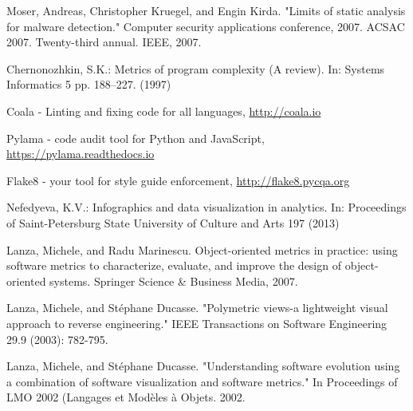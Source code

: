 \documentclass[runningheads,a4paper]{llncs}
\begin{document}
\begin{thebibliography}{4}
 Moser, Andreas, Christopher Kruegel, and Engin Kirda. "Limits of static analysis for malware detection." Computer security applications conference, 2007. ACSAC 2007. Twenty-third annual. IEEE, 2007.

 Chernonozhkin, S.K.: Metrics of program complexity (A review).
  In: Systems Informatics 5 pp. 188--227. (1997)
  
 Coala - Linting and fixing code for all languages, \url{http://coala.io}

 Pylama - code audit tool for Python and JavaScript, \url{https://pylama.readthedocs.io}

 Flake8 - your tool for style guide enforcement, \url{http://flake8.pycqa.org}

 Nefedyeva, K.V.: Infographics and data visualization in
  analytics. In: Proceedings of Saint-Petersburg State University of Culture and
  Arts 197 (2013)

 Lanza, Michele, and Radu Marinescu. Object-oriented metrics in practice: using software metrics to characterize, evaluate, and improve the design of object-oriented systems. Springer Science \& Business Media, 2007.

 Lanza, Michele, and Stéphane Ducasse. "Polymetric views-a lightweight visual approach to reverse engineering." IEEE Transactions on Software Engineering 29.9 (2003): 782-795.

 Lanza, Michele, and Stéphane Ducasse. "Understanding software evolution using a combination of software visualization and software metrics." In Proceedings of LMO 2002 (Langages et Modèles à Objets. 2002.

\end{thebibliography}
\end{document}
